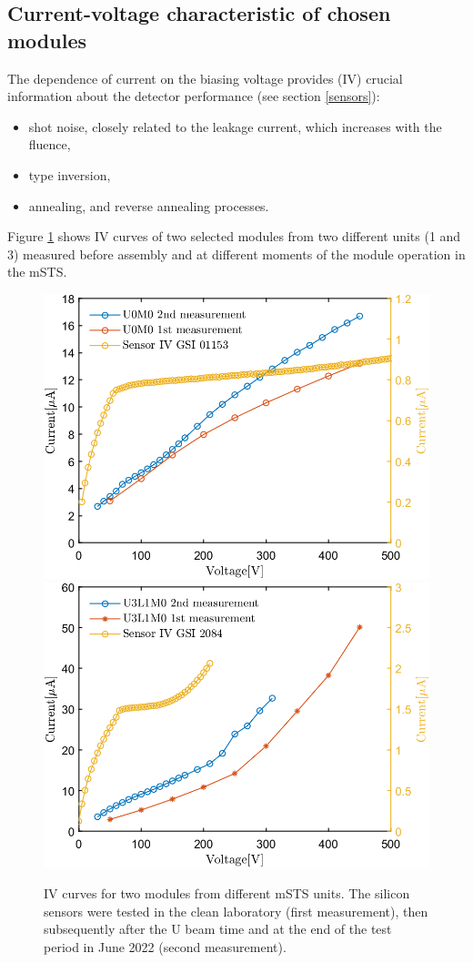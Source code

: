 \subsection{Current-voltage characteristic of chosen modules}
The dependence of current on the biasing voltage provides (IV) crucial information about the detector performance (see section \ref{sensors}):
\begin{itemize}
    \item shot noise, closely related to the leakage current, which increases with the fluence,
    \item type inversion,
    \item annealing, and reverse annealing processes.
\end{itemize}
Figure \ref{fig_IV} shows IV curves of two selected modules from two different units (1 and 3) measured before assembly and at different moments of the module operation in the \gls{mSTS}.
\begin{figure}[!h]
\centering
\includegraphics[width=0.48\columnwidth]{Chapter6/DCS/images/IV/U0FEB1.png}
\includegraphics[width=0.48\columnwidth]{Chapter6/DCS/images/IV/U3L1FEB1.png}
\caption{IV curves for two modules from different \gls{mSTS} units. The silicon sensors were tested in the clean laboratory (first measurement), then subsequently after the U beam time and at the end of the test period in June 2022 (second measurement).}
\label{fig_IV}
\end{figure}
